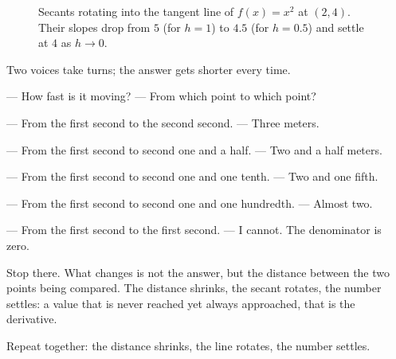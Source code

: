 \begin{figure}[htbp]
\centering
{}
\caption{Secants rotating into the tangent line of $f(x)=x^{2}$ at $(2,4)$.
Their slopes drop from $5$ (for $h=1$) to $4.5$ (for $h=0.5$) and settle at $4$
as $h\to0$.}
\label{fig:sekan-singgung}
\end{figure}

\begin{bacakeras}
Two voices take turns; the answer gets shorter every time.

--- How fast is it moving? --- From which point to which point?

--- From the first second to the second second. --- Three meters.

--- From the first second to second one and a half. --- Two and a half meters.

--- From the first second to second one and one tenth. --- Two and one fifth.

--- From the first second to second one and one hundredth. --- Almost two.

--- From the first second to the first second. --- I cannot. The denominator is zero.

Stop there. What changes is not the answer, but the distance between the two points being
compared. The distance shrinks, the secant rotates, the number settles: a value that is never
reached yet always approached, that is the derivative.

Repeat together: the distance shrinks, the line rotates, the number settles.
\end{bacakeras}

